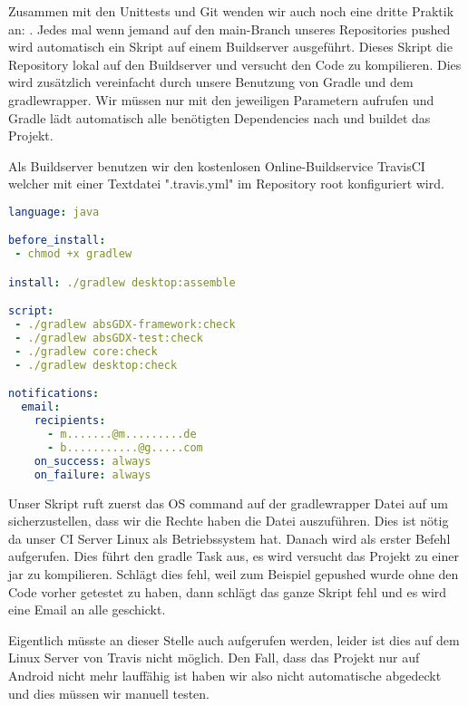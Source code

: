 Zusammen mit den Unittests und Git wenden wir auch noch eine dritte Praktik an: .
Jedes mal wenn jemand auf den main-Branch unseres Repositories pushed wird automatisch ein Skript auf einem Buildserver ausgeführt.
Dieses Skript  die Repository lokal auf den Buildserver und versucht den Code zu kompilieren. Dies wird zusätzlich vereinfacht durch unsere Benutzung von Gradle und dem gradlewrapper. Wir müssen nur  mit den jeweiligen Parametern aufrufen und Gradle lädt automatisch alle benötigten Dependencies nach und buildet das Projekt.

Als Buildserver benutzen wir den kostenlosen Online-Buildservice TravisCI \cite{TRVS} welcher mit einer Textdatei ".travis.yml" im Repository root konfiguriert wird.

\begin{lstlisting}[caption=TravisCI Konfiguration, title=\hspace{0 pt}, language=yaml]
language: java

before_install:
 - chmod +x gradlew

install: ./gradlew desktop:assemble

script: 
 - ./gradlew absGDX-framework:check
 - ./gradlew absGDX-test:check
 - ./gradlew core:check
 - ./gradlew desktop:check

notifications:
  email:
    recipients:
      - m.......@m.........de
      - b...........@g.....com
    on_success: always
    on_failure: always
\end{lstlisting}

Unser Skript ruft zuerst das OS command  auf der gradlewrapper Datei auf um sicherzustellen, dass wir die Rechte haben die Datei auszuführen. Dies ist nötig da unser CI Server Linux als Betriebssystem hat.
Danach wird als erster Befehl  aufgerufen. Dies führt den gradle Task  aus, es wird versucht das Projekt zu einer jar zu kompilieren. Schlägt dies fehl, weil zum Beispiel gepushed wurde ohne den Code vorher getestet zu haben, dann schlägt das ganze Skript fehl und es wird eine Email an alle  geschickt.

Eigentlich müsste an dieser Stelle auch  aufgerufen werden, leider ist dies auf dem Linux Server von Travis nicht möglich. Den Fall, dass das Projekt nur auf Android nicht mehr lauffähig ist haben wir also nicht automatische abgedeckt und dies müssen wir manuell testen.

